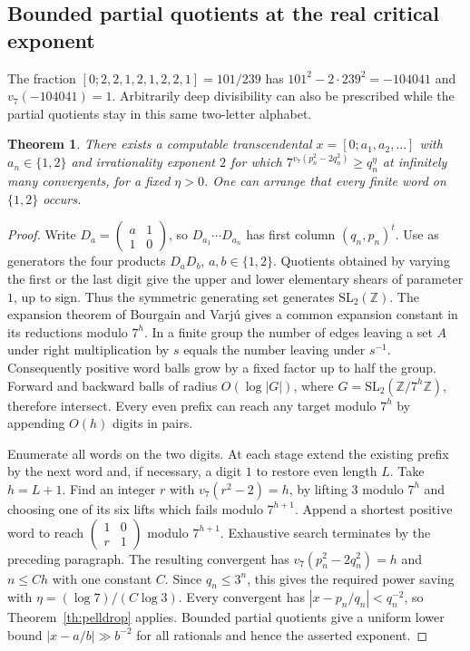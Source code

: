 \documentclass[11pt,a4paper]{article}
\newtheorem{theorem}{Theorem}[section]
\begin{document}
\subsection{Bounded partial quotients at the real critical exponent}
The fraction $[0;2,2,1,2,1,2,2,1]=101/239$ has
$101^2-2\cdot239^2=-104041$ and $v_7(-104041)=1$.
Arbitrarily deep divisibility can also be prescribed while the
partial quotients stay in this same two-letter alphabet.
\begin{theorem}\label{th:pellbounded}
There exists a computable transcendental $x=[0;a_1,a_2,\ldots]$ with
$a_n\in\{1,2\}$ and irrationality exponent $2$ for which
$7^{v_7(p_n^2-2q_n^2)}\ge q_n^\eta$ at infinitely many convergents,
for a fixed $\eta>0$. One can arrange that every finite word on
$\{1,2\}$ occurs.
\end{theorem}
\begin{proof}
Write $D_a=\left(\begin{smallmatrix}a&1\\1&0\end{smallmatrix}\right)$,
so $D_{a_1}\cdots D_{a_n}$ has first column $(q_n,p_n)^t$.
Use as generators the four products $D_aD_b$, $a,b\in\{1,2\}$.
Quotients obtained by varying the first or the last digit give the upper
and lower elementary shears of parameter $1$, up to sign. Thus the
symmetric generating set generates $\mathrm{SL}_2(\mathbb Z)$.
The expansion theorem of Bourgain and Varj\'u \cite[Thm.~1]{bv}
gives a common expansion constant in its reductions modulo $7^h$.
In a finite group the number of edges leaving a set $A$ under right
multiplication by $s$ equals the number leaving under $s^{-1}$.
Consequently positive word balls grow by a fixed factor up to half
the group. Forward and backward balls of radius $O(\log |G|)$, where
$G=\mathrm{SL}_2(\mathbb Z/7^h\mathbb Z)$, therefore intersect.
Every even prefix can reach any target modulo $7^h$ by appending
$O(h)$ digits in pairs.

Enumerate all words on the two digits. At each stage extend the existing
prefix by the next word and, if necessary, a digit $1$ to restore even
length $L$. Take $h=L+1$. Find an integer $r$ with
$v_7(r^2-2)=h$, by lifting $3$ modulo $7^h$ and choosing one of its
six lifts which fails modulo $7^{h+1}$. Append a shortest positive word
to reach $\left(\begin{smallmatrix}1&0\\r&1\end{smallmatrix}\right)$
modulo $7^{h+1}$. Exhaustive search terminates by the preceding paragraph.
The resulting convergent has $v_7(p_n^2-2q_n^2)=h$ and $n\le C h$
with one constant $C$. Since $q_n\le3^n$, this gives the required power
saving with $\eta=(\log 7)/(C\log 3)$. Every convergent has
$|x-p_n/q_n|<q_n^{-2}$, so Theorem~\ref{th:pelldrop} applies.
Bounded partial quotients give a uniform lower bound
$|x-a/b|\gg b^{-2}$ for all rationals and hence the asserted exponent.
\end{proof}
\end{document}
